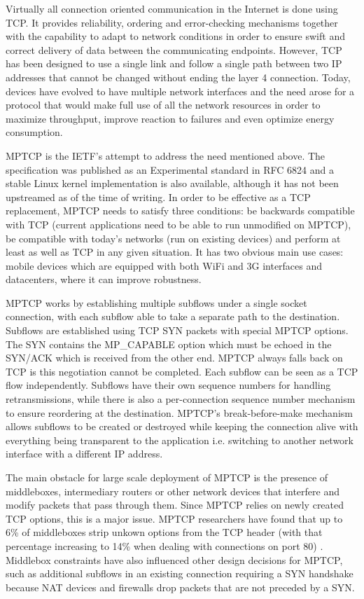 
Virtually all connection oriented communication in the Internet is done using TCP. It provides reliability, ordering and error-checking mechanisms together with the capability to adapt to network conditions in order to ensure swift and correct delivery of data between the communicating endpoints. However, TCP has been designed to use a single link and follow a single path between two IP addresses that cannot be changed without ending the layer 4 connection. Today, devices have evolved to have multiple network interfaces and the need arose for a protocol that would make full use of all the network resources in order to maximize throughput, improve reaction to failures and even optimize energy consumption. 

MPTCP is the IETF's attempt to address the need mentioned above. The specification was published as an Experimental standard in RFC 6824 and a stable Linux kernel implementation is also available, although it has not been upstreamed as of the time of writing. In order to be effective as a TCP replacement, MPTCP needs to satisfy three conditions: be backwards compatible with TCP (current applications need to be able to run unmodified on MPTCP), be compatible with today's networks (run on existing devices) and perform at least as well as TCP in any given situation. It has two obvious main use cases: mobile devices which are equipped with both WiFi and 3G interfaces and datacenters, where it can improve robustness.

MPTCP works by establishing multiple subflows under a single socket connection, with each subflow able to take a separate path to the destination. Subflows are established using TCP SYN packets with special MPTCP options. The SYN contains the MP_CAPABLE option which must be echoed in the SYN/ACK which is received from the other end. MPTCP always falls back on TCP is this negotiation cannot be completed. Each subflow can be seen as a TCP flow independently. Subflows have their own sequence numbers for handling retransmissions, while there is also a per-connection sequence number mechanism to ensure reordering at the destination. MPTCP's break-before-make mechanism allows subflows to be created or destroyed while keeping the connection alive with everything being transparent to the application i.e. switching to another network interface with a different IP address. 

The main obstacle for large scale deployment of MPTCP is the presence of
middleboxes, intermediary routers or other network devices that interfere and
modify packets that pass through them. Since MPTCP relies on newly created TCP
options, this is a major issue. MPTCP researchers have found that up to 6\% of
middleboxes strip unkown options from the TCP header (with that percentage
increasing to 14\% when dealing with connections on port 80)
\cite{how-hard-can-it-be}. Middlebox constraints have also influenced other
design decisions for MPTCP, such as additional subflows in an existing
connection requiring a SYN handshake because NAT devices and firewalls drop
packets that are not preceded by a SYN.

